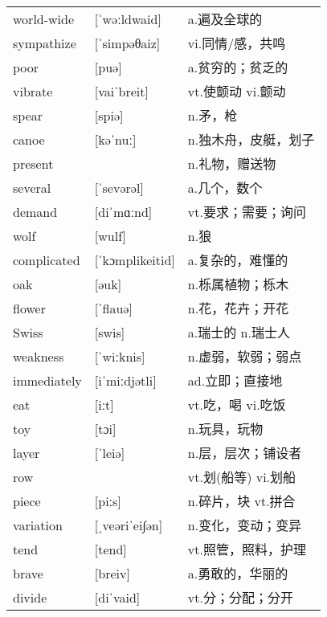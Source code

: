 \documentclass[a4paper]{article}
\begin{document}
\section{}
\begin{tabular}{l l l}

world-wide & [ˈwəːldwaid] & a.遍及全球的 \\
sympathize & [ˈsimpəθaiz] & vi.同情/感，共鸣 \\
poor & [puə] & a.贫穷的；贫乏的 \\
vibrate & [vaiˈbreit] & vt.使颤动 vi.颤动 \\
spear & [spiə] & n.矛，枪 \\
canoe & [kəˈnuː] & n.独木舟，皮艇，划子 \\
present &  & n.礼物，赠送物 \\
several & [ˈsevərəl] & a.几个，数个 \\
demand & [diˈmɑːnd] & vt.要求；需要；询问 \\
wolf & [wulf] & n.狼 \\
complicated & [ˈkɔmplikeitid] & a.复杂的，难懂的 \\
oak & [əuk] & n.栎属植物；栎木 \\
flower & [ˈflauə] & n.花，花卉；开花 \\
Swiss & [swis] & a.瑞士的 n.瑞士人 \\
weakness & [ˈwiːknis] & n.虚弱，软弱；弱点 \\
immediately & [iˈmiːdjətli] & ad.立即；直接地 \\
eat & [iːt] & vt.吃，喝 vi.吃饭 \\
toy & [tɔi] & n.玩具，玩物 \\
layer & [ˈleiə] & n.层，层次；铺设者 \\
row &  & vt.划(船等) vi.划船 \\
piece & [piːs] & n.碎片，块 vt.拼合 \\
variation & [ˌveəriˈei∫ən] & n.变化，变动；变异 \\
tend & [tend] & vt.照管，照料，护理 \\
brave & [breiv] & a.勇敢的，华丽的 \\
divide & [diˈvaid] & vt.分；分配；分开 \\

\end{tabular}
\end{document}

